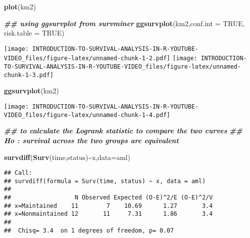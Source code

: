 \documentclass[
]{article}
\newenvironment{Shaded}{\begin{snugshade}}{\end{snugshade}}
\newcommand{\AttributeTok}[1]{\textcolor[rgb]{0.13,0.29,0.53}{#1}}
\newcommand{\ConstantTok}[1]{\textcolor[rgb]{0.56,0.35,0.01}{#1}}
\newcommand{\DocumentationTok}[1]{\textcolor[rgb]{0.56,0.35,0.01}{\textbf{\textit{#1}}}}
\newcommand{\FunctionTok}[1]{\textcolor[rgb]{0.13,0.29,0.53}{\textbf{#1}}}
\newcommand{\NormalTok}[1]{#1}
\newcommand{\SpecialCharTok}[1]{\textcolor[rgb]{0.81,0.36,0.00}{\textbf{#1}}}
\begin{document}
\begin{Shaded}
\begin{Highlighting}[]
\FunctionTok{plot}\NormalTok{(km2)}


\DocumentationTok{\#\# using ggsurvplot from survminer}
\FunctionTok{ggsurvplot}\NormalTok{(km2,}\AttributeTok{conf.int =} \ConstantTok{TRUE}\NormalTok{,}
           \AttributeTok{risk.table =} \ConstantTok{TRUE}\NormalTok{)}
\end{Highlighting}
\end{Shaded}

\texttt{[image: INTRODUCTION-TO-SURVIVAL-ANALYSIS-IN-R-YOUTUBE-VIDEO\_files/figure-latex/unnamed-chunk-1-2.pdf]}
\texttt{[image: INTRODUCTION-TO-SURVIVAL-ANALYSIS-IN-R-YOUTUBE-VIDEO\_files/figure-latex/unnamed-chunk-1-3.pdf]}

\begin{Shaded}
\begin{Highlighting}[]
\FunctionTok{ggsurvplot}\NormalTok{(km2)}
\end{Highlighting}
\end{Shaded}

\texttt{[image: INTRODUCTION-TO-SURVIVAL-ANALYSIS-IN-R-YOUTUBE-VIDEO\_files/figure-latex/unnamed-chunk-1-4.pdf]}

\begin{Shaded}
\begin{Highlighting}[]
\DocumentationTok{\#\# to calculate the Logrank statistic to compare the two curves}
\DocumentationTok{\#\# Ho : survival across the two groups are equivalent}

\FunctionTok{survdiff}\NormalTok{(}\FunctionTok{Surv}\NormalTok{(time,status)}\SpecialCharTok{\textasciitilde{}}\NormalTok{x,}\AttributeTok{data=}\NormalTok{aml)}
\end{Highlighting}
\end{Shaded}

\begin{verbatim}
## Call:
## survdiff(formula = Surv(time, status) ~ x, data = aml)
## 
##                  N Observed Expected (O-E)^2/E (O-E)^2/V
## x=Maintained    11        7    10.69      1.27       3.4
## x=Nonmaintained 12       11     7.31      1.86       3.4
## 
##  Chisq= 3.4  on 1 degrees of freedom, p= 0.07
\end{verbatim}
\end{document}
